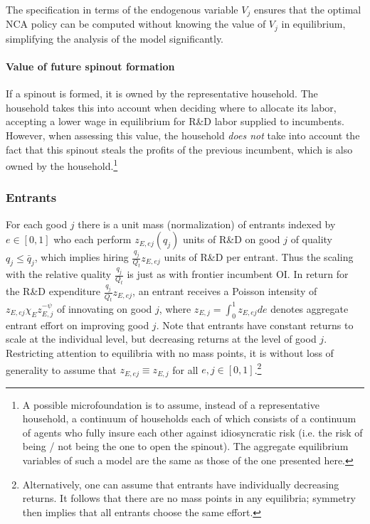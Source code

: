 \documentclass[11pt,english]{article}
\theoremstyle{remark}
\begin{document}
The specification in terms of the endogenous variable $V_j$ ensures that the optimal NCA policy can be computed without knowing the value of $V_j$ in equilibrium, simplifying the analysis of the model significantly.

\paragraph{Value of future spinout formation}

If a spinout is formed, it is owned by the representative household. The household takes this into account when deciding where to allocate its labor, accepting a lower wage in equilibrium for R\&D labor supplied to incumbents. However, when assessing this value, the household \textit{does not} take into account the fact that this spinout steals the profits of the previous incumbent, which is also owned by the household.\footnote{A possible microfoundation is to assume, instead of a representative household, a continuum of households each of which consists of a continuum of agents who fully insure each other against idiosyncratic risk (i.e. the risk of being / not being the one to open the spinout). The aggregate equilibrium variables of such a model are the same as those of the one presented here.} 



\subsubsection{Entrants} \label{subsubsec:entrants}

For each good $j$ there is a unit mass (normalization) of entrants indexed by $e \in [0,1]$ who each perform $z_{E,ej}(q_j)$ units of R\&D on good $j$ of quality $q_j \le \bar{q}_{j}$, which implies hiring $\frac{q_j}{Q_t}z_{E,ej}$ units of R\&D per entrant. Thus the scaling with the relative quality $\frac{q_j}{Q_t}$ is just as with frontier incumbent OI. In return for the R\&D expenditure $\frac{q_j}{Q_t} z_{E,ej}$, an entrant receives a Poisson intensity of $z_{E,ej} \chi_E z_{E,j}^{-\psi}$ of innovating on good $j$, where $z_{E,j} = \int_0^1 z_{E,ej} de$ denotes aggregate entrant effort on improving good $j$. Note that entrants have constant returns to scale at the individual level, but decreasing returns at the level of good $j$. Restricting attention to equilibria with no mass points, it is without loss of generality to assume that $z_{E,ej} \equiv z_{E,j}$ for all $e,j \in [0,1]$.\footnote{Alternatively, one can assume that entrants have individually decreasing returns. It follows that there are no mass points in any equilibria; symmetry then implies that all entrants choose the same effort.}
\end{document}
